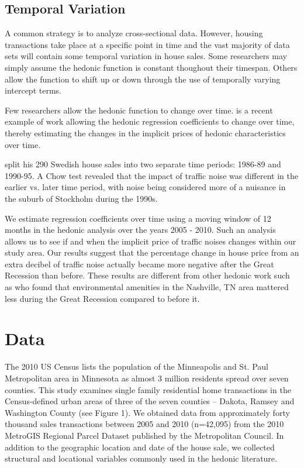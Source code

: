 \documentclass{article}\usepackage{graphicx, color}
\begin{document}
\subsection{Temporal Variation}
A common strategy is to analyze cross-sectional data. However, housing transactions take place at a specific point in time and the vast majority of data sets will contain some temporal variation in house sales. Some researchers may simply assume the hedonic function is constant thoughout their timespan. Others allow the function to shift up or down through the use of temporally varying intercept terms.

Few researchers allow the hedonic function to change over time. \citet{Cho2011b} is a recent example of work allowing the hedonic regression coefficients to change over time, thereby estimating the changes in the implicit prices of hedonic characteristics over time. 

\citet{Wilhelmsson2000} split his 290 Swedish house sales into two separate time periods: 1986-89 and 1990-95. A Chow test revealed that the impact of traffic noise was different in the earlier vs. later time period, with noise being considered more of a nuisance in the suburb of Stockholm during the 1990s. 

We estimate regression coefficients over time using a moving window of 12 months in the hedonic analysis over the years 2005 - 2010. Such an analysis allows us to see if and when the implicit price of traffic noises changes within our study area. Our results suggest that the percentage change in house price from an extra decibel of traffic noise actually became more negative after the Great Recession than before. These results are different from other hedonic work such as \citet{Cho2011b} who found that environmental amenities in the Nashville, TN area mattered less during the Great Recession compared to before it.




\section{Data}
The 2010 US Census lists the population of the Minneapolis and St. Paul Metropolitan area in Minnesota as almost 3 million residents spread over seven counties. This study examines single family residential home transactions in the Census-defined urban areas of three of the seven counties – Dakota, Ramsey and Washington County (see Figure 1). We obtained data from approximately forty thousand sales transactions between 2005 and 2010 (n=42,095) from the 2010 MetroGIS Regional Parcel Dataset published by the Metropolitan Council. In addition to the geographic location and date of the house sale, we collected structural and locational variables commonly used in the hedonic literature. 
\end{document}

